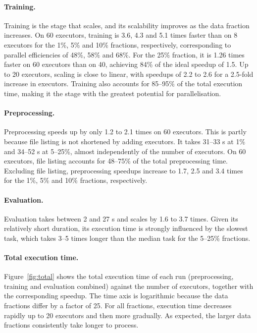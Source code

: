 \documentclass[a4paper, 11pt]{article} %
\begin{document}
\paragraph{Training.} Training is the stage that scales, and its scalability improves as the data fraction increases. On 60 executors, training is 3.6, 4.3 and 5.1 times faster than on 8 executors for the 1\%, 5\% and 10\% fractions, respectively, corresponding to parallel efficiencies of 48\%, 58\% and 68\%. For the 25\% fraction, it is 1.26 times faster on 60 executors than on 40, achieving 84\% of the ideal speedup of 1.5. Up to 20 executors, scaling is close to linear, with speedups of 2.2 to 2.6 for a 2.5-fold increase in executors. Training also accounts for 85--95\% of the total execution time, making it the stage with the greatest potential for parallelisation.

\paragraph{Preprocessing.} Preprocessing speeds up by only 1.2 to 2.1 times on 60 executors. This is partly because file listing is not shortened by adding executors. It takes 31--33 s at 1\% and 34--52 s at 5--25\%, almost independently of the number of executors. On 60 executors, file listing accounts for 48--75\% of the total preprocessing time. Excluding file listing, preprocessing speedups increase to 1.7, 2.5 and 3.4 times for the 1\%, 5\% and 10\% fractions, respectively.

\paragraph{Evaluation.} Evaluation takes between 2 and 27 s and scales by 1.6 to 3.7 times. Given its relatively short duration, its execution time is strongly influenced by the slowest task, which takes 3--5 times longer than the median task for the 5--25\% fractions.

\paragraph{Total execution time.} Figure~\ref{fig:total} shows the total execution time of each run (preprocessing, training and evaluation combined) against the number of executors, together with the corresponding speedup. The time axis is logarithmic because the data fractions differ by a factor of 25. For all fractions, execution time decreases rapidly up to 20 executors and then more gradually. As expected, the larger data fractions consistently take longer to process.
\end{document}
